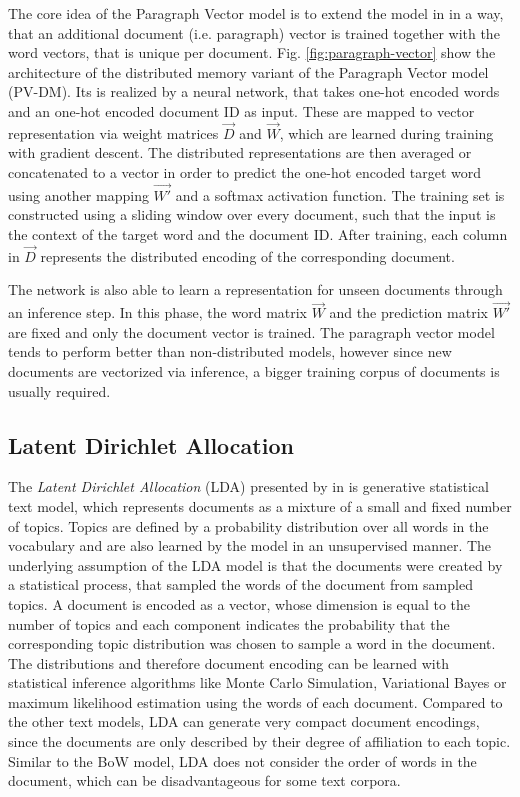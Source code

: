 The core idea of the Paragraph Vector model is to extend the model in \cite{DBLP:journals/jmlr/BengioDVJ03} in a way, that an additional document (i.e. paragraph) vector is trained together with the word vectors, that is unique per document.
Fig. \ref{fig:paragraph-vector} show the architecture of the distributed memory variant of the Paragraph Vector model (PV-DM).
Its is realized by a neural network, that takes one-hot encoded words and an one-hot encoded document ID as input.
These are mapped to vector representation via weight matrices $\vec{D}$ and $\vec{W}$, which are learned during training with gradient descent.
The distributed representations are then averaged or concatenated to a vector in order to predict the one-hot encoded target word using another mapping $\vec{W'}$ and a softmax activation function.
The training set is constructed using a sliding window over every document, such that the input is the context of the target word and the document ID.
After training, each column in $\vec{D}$ represents the distributed encoding of the corresponding document.

The network is also able to learn a representation for unseen documents through an inference step.
In this phase, the word matrix $\vec{W}$ and the prediction matrix $\vec{W'}$ are fixed and only the document vector is trained.
The paragraph vector model tends to perform better than non-distributed models, however since new documents are vectorized via inference, a bigger training corpus of documents is usually required.

\subsection{Latent Dirichlet Allocation}\label{sec:lda}

The \textit{Latent Dirichlet Allocation} (LDA) presented by \citeauthor{DBLP:journals/jmlr/BleiNJ03} in \citeyear{DBLP:journals/jmlr/BleiNJ03} \cite{DBLP:journals/jmlr/BleiNJ03} is generative statistical text model, which represents documents as a mixture of a small and fixed number of topics.
Topics are defined by a probability distribution over all words in the vocabulary and are also learned by the model in an unsupervised manner.
The underlying assumption of the LDA model is that the documents were created by a statistical process, that sampled the words of the document from sampled topics.
A document is encoded as a vector, whose dimension is equal to the number of topics and each component indicates the probability that the corresponding topic distribution was chosen to sample a word in the document.
The distributions and therefore document encoding can be learned with statistical inference algorithms like Monte Carlo Simulation, Variational Bayes or maximum likelihood estimation using the words of each document.
Compared to the other text models, LDA can generate very compact document encodings, since the documents are only described by their degree of affiliation to each topic.
Similar to the BoW model, LDA does not consider the order of words in the document, which can be disadvantageous for some text corpora.

